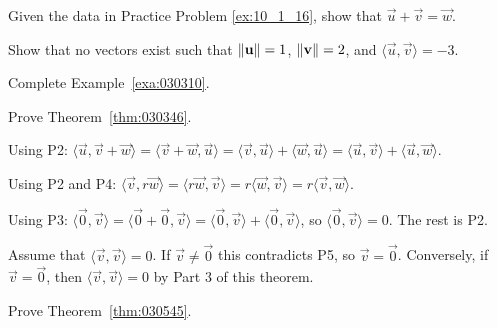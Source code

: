 \documentclass{ximera}
\begin{document}
\begin{problem}\label{prob:inner_prod_17}
Given the data in Practice Problem \ref{ex:10_1_16}, show that $\vec{u} + \vec{v} = \vec{w}$.
\end{problem}

\begin{problem}\label{prob:inner_prod_18}
Show that no vectors exist such that $\left\lVert\mathbf{u}\right\rVert = 1$, $\left\lVert\mathbf{v}\right\rVert = 2$, and $\langle\vec{u}, \vec{v}\rangle = -3$.
\end{problem}

\begin{problem} \label{ex:10_1_19}
Complete Example~\ref{exa:030310}.
\end{problem}

\begin{problem} \label{ex:10_1_20}
Prove Theorem~\ref{thm:030346}.

\begin{hint}
 Using P2:
$ \langle \vec{u}, \vec{v} + \vec{w} \rangle =
\langle \vec{v} + \vec{w}, \vec{u} \rangle =
\langle \vec{v}, \vec{u} \rangle + \langle \vec{w}, \vec{u} \rangle =
\langle \vec{u}, \vec{v} \rangle + \langle \vec{u}, \vec{w} \rangle$.

 Using P2 and P4:
$\langle \vec{v}, r\vec{w} \rangle =
\langle r\vec{w}, \vec{v} \rangle =
r \langle \vec{w}, \vec{v} \rangle =
r \langle \vec{v}, \vec{w} \rangle$.

 Using P3:
$\langle \vec{0}, \vec{v} \rangle =
\langle \vec{0} + \vec{0}, \vec{v} \rangle =
\langle \vec{0}, \vec{v} \rangle + \langle \vec{0}, \vec{v} \rangle
$, so $ \langle \vec{0}, \vec{v} \rangle = 0$. The rest is P2.

 Assume that $\langle \vec{v}, \vec{v} \rangle = 0$. If $\vec{v} \neq \vec{0}$ this contradicts P5, so $\vec{v} = \vec{0}$. Conversely, if $\vec{v} = \vec{0}$, then $\langle \vec{v}, \vec{v} \rangle = 0$ by Part 3 of this theorem.
\end{hint}
\end{problem}

\begin{problem} \label{ex:10_1_21}
Prove Theorem~\ref{thm:030545}.
\end{problem}
\end{document}
